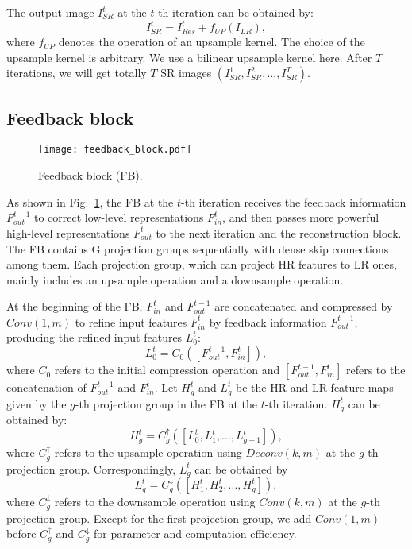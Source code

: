 \documentclass[10pt,twocolumn,letterpaper]{article}
\begin{document}
	The output image $I_{SR}^{t}$ at the $t$-th iteration can be obtained by:
	\begin{equation}
	I_{SR}^{t} = I_{Res}^{t}+f_{UP}(I_{LR}),
	\end{equation}
	where $f_{UP}$ denotes the operation of an upsample kernel. The choice of the upsample kernel is arbitrary. We use a bilinear upsample kernel here.
	After $T$ iterations, we will get totally $T$ SR images $(I_{SR}^{1}, I_{SR}^{2}, ..., I_{SR}^{T})$.  
	
	\subsection{Feedback block}
	\label{Sec3.2}
	
	\begin{figure}[h]
		\centering
		\texttt{[image: feedback\_block.pdf]}
		\caption{Feedback block (FB).}
		\label{FB}
	\end{figure}
	
    As shown in Fig.~\ref{FB}, the FB at the $t$-th iteration receives the feedback information $F_{out}^{t-1}$ to correct low-level representations $F_{in}^{t}$, and then passes more powerful high-level representations $F_{out}^{t}$ to the next iteration and the reconstruction block. The FB contains G projection groups sequentially with dense skip connections among them. Each projection group, which can project HR features to LR ones, mainly includes an upsample operation and a downsample operation.
	
	At the beginning of the FB, $F_{in}^{t}$ and $F_{out}^{t-1}$ are concatenated and compressed by $Conv(1,m)$ to refine input features $F_{in}^{t}$ by feedback information $F_{out}^{t-1}$, producing the refined input features $L_{0}^{t}$:
	\begin{equation}
	L_{0}^{t} = C_{0}([F_{out}^{t-1}, F_{in}^{t}]),
	\end{equation}
	where $C_{0}$ refers to the initial compression operation and $[F_{out}^{t-1}, F_{in}^{t}]$ refers to the concatenation of $F_{out}^{t-1}$ and $F_{in}^{t}$. Let $H_{g}^{t}$ and $L_{g}^{t}$ be the HR and LR feature maps given by the $g$-th projection group in the FB at the $t$-th iteration. $H_{g}^{t}$ can be obtained by:
	\begin{equation}
	H_{g}^{t} = C_{g}^{\uparrow}([L_{0}^{t}, L_{1}^{t}, ..., L_{g-1}^{t}]),
	\end{equation}
	where $C_{g}^{\uparrow}$ refers to the upsample operation using $Deconv(k,m)$ at the $g$-th projection group. Correspondingly, $L_{g}^{t}$ can be obtained by
	\begin{equation}
	L_{g}^{t} = C_{g}^{\downarrow}([H_{1}^{t}, H_{2}^{t}, ..., H_{g}^{t}]),
	\end{equation}
	where $C_{g}^{\downarrow}$ refers to the downsample operation using $Conv(k,m)$ at the $g$-th projection group.
	Except for the first projection group, we add $Conv(1,m)$ before $C_{g}^{\uparrow}$ and $C_{g}^{\downarrow}$ for parameter and computation efficiency.
	
\end{document}
